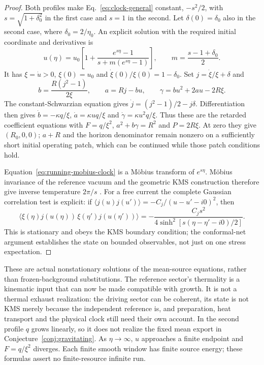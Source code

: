 \begin{proof}
Both profiles make Eq.~\eqref{eq:clock-general} constant, $-s^2/2$,
with $s=\sqrt{1+\delta_0^2}$ in the first case and $s=1$ in the second.
Let $\delta(0)=\delta_0$ also in the second case, where
$\delta_0=2/\eta_0$. An explicit solution with the required initial
coordinate and derivatives is
\begin{equation}\label{eq:running-mobius-clock}
 u(\eta)=u_0\left[1+\frac{e^{s\eta}-1}
 {s+m(e^{s\eta}-1)}\right],\qquad
 m=\frac{s-1+\delta_0}{2}.
\end{equation}
It has $\xi=\dot u>0$, $\xi(0)=u_0$ and
$\dot\xi(0)/\xi(0)=1-\delta_0$. Set $j=\dot\xi/\xi+\delta$ and
\[
 b=\frac{R(j^2-1)}{2\xi},\qquad a=Rj-bu,\qquad
 \gamma=bu^2+2au-2R\xi.
\]
The constant-Schwarzian equation gives
$\dot j=(j^2-1)/2-j\delta$.
Differentiation then gives
$\dot b=-\kappa q/\xi$, $\dot a=\kappa uq/\xi$ and
$\dot\gamma=\kappa u^2q/\xi$.
Thus these are the retarded coefficient equations with
$F=q/\xi^2$, $a^2+b\gamma=R^2$ and $P=2R\xi$.
At zero they give $(R_0,0,0)$; $a+R$ and the horizon denominator remain
nonzero on a sufficiently short initial operating patch, which can be
continued while those patch conditions hold.

Equation~\eqref{eq:running-mobius-clock} is a M\"obius transform of
$e^{s\eta}$. M\"obius invariance of the reference vacuum and the geometric
KMS construction therefore give inverse temperature $2\pi/s$
\cite[Sec.~2.8, Proposition~2.4 and Theorem~2.5]{Camassa2012KMS}.
For a free current the complete Gaussian correlation test is explicit:
if $\langle j(u)j(u')\rangle=-C_j/(u-u'-i0)^2$, then
\[
 \langle \xi(\eta)j(u(\eta))\,\xi(\eta')j(u(\eta'))\rangle
 =-\frac{C_js^2}{4\sinh^2[s(\eta-\eta'-i0)/2]}.
\]
This is stationary and obeys the KMS boundary condition; the conformal-net
argument establishes the state on bounded observables, not just on one
stress expectation.
\end{proof}

These are actual nonstationary solutions of the mean-source equations, rather
than frozen-background substitutions. The reference sector's thermality is a
kinematic input that can now be made compatible with growth. It is not a
thermal exhaust realization: the driving sector can be coherent, its state
is not KMS merely because the independent reference is, and preparation,
heat transport and the physical clock still need their own account. In the
second profile $q$ grows linearly, so it does not realize the fixed mean
export in Conjecture~\ref{conj:gravitating}. As $\eta\to\infty$, $u$ approaches
a finite endpoint and $F=q/\xi^2$ diverges. Each finite smooth window has
finite source energy; these formulas assert no finite-resource infinite run.


